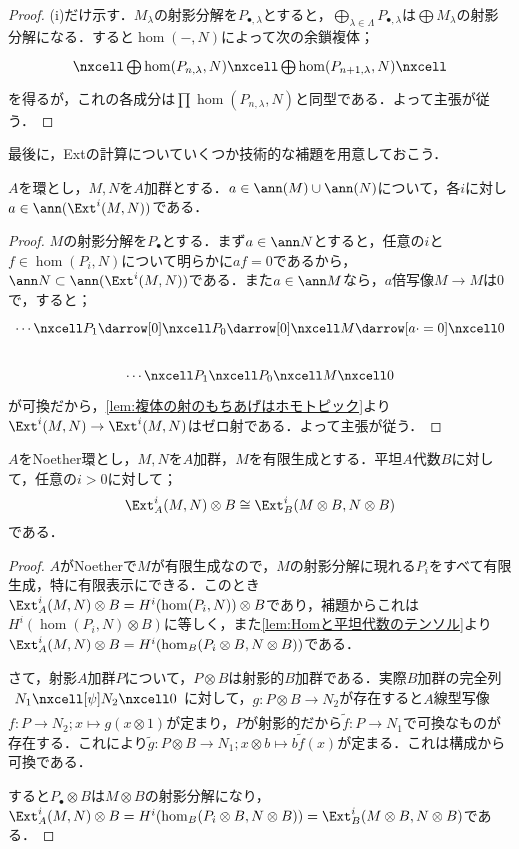 \begin{proof}
	(i)だけ示す．$M_\lambda$の射影分解を$P_{\bullet,\lambda}$とすると，$\bigoplus_{\lambda\in\Lambda} P_{\bullet,\lambda}$は$\bigoplus M_\lambda$の射影分解になる．すると$\hom(-,N)$によって次の余鎖複体；
	\[\begin{tikzcd}
		\nxcell\bigoplus \hom(P_{n,\lambda},N)\nxcell\bigoplus\hom(P_{n+1,\lambda},N)\nxcell
	\end{tikzcd}\]
	を得るが，これの各成分は$\prod\hom(P_{n,\lambda},N)$と同型である．よって主張が従う．
\end{proof}

最後に，Extの計算についていくつか技術的な補題を用意しておこう．

\begin{prop}\label{prop:ExtのAnn}
	$A$を環とし，$M,N$を$A$加群とする．$a\in\ann (M)\cup\ann (N)$について，各$i$に対し$a\in\ann(\Ext^i(M,N))$である．
\end{prop}

\begin{proof}
	$M$の射影分解を$P_\bullet$とする．まず$a\in\ann N$とすると，任意の$i$と$f\in\hom(P_i,N)$について明らかに$af=0$であるから，$\ann N\subset\ann(\Ext^i(M,N))$である．また$a\in\ann M$なら，$a$倍写像$M\to M$は$0$で，すると；
	\[\begin{tikzcd}
	\cdots\nxcell P_1\darrow[0]\nxcell P_0\darrow[0]\nxcell M\darrow[a\cdot=0]\nxcell0\\
	\cdots\nxcell P_1\nxcell P_0\nxcell M\nxcell 0
	\end{tikzcd}\]
	が可換だから，\ref{lem:複体の射のもちあげはホモトピック}より$\Ext^i(M,N)\to\Ext^i(M,N)$はゼロ射である．よって主張が従う．
\end{proof}

\begin{prop}\label{prop:平坦とExtの交換}
	$A$をNoether環とし，$M,N$を$A$加群，$M$を有限生成とする．平坦$A$代数$B$に対して，任意の$i>0$に対して；
	\[\Ext^i_A(M,N)\otimes B\cong\Ext^i_{B}(M\otimes B,N\otimes B)\]
	である．
\end{prop}

\begin{proof}
	$A$がNoetherで$M$が有限生成なので，$M$の射影分解に現れる$P_i$をすべて有限生成，特に有限表示にできる．このとき$\Ext^i_A(M,N)\otimes B=H^i(\hom(P_i,N))\otimes B$であり，補題からこれは$H^i(\hom(P_i,N)\otimes B)$に等しく，また\ref{lem:Homと平坦代数のテンソル}より$\Ext^i_A(M,N)\otimes B=H^i(\hom_B(P_i\otimes B,N\otimes B))$である．
	
	さて，射影$A$加群$P$について，$P\otimes B$は射影的$B$加群である．実際$B$加群の完全列$\begin{tikzcd}
	N_1\nxcell[\psi]N_2\nxcell0
	\end{tikzcd}$に対して，$g:P\otimes B\to N_2$が存在すると$A$線型写像$f:P\to N_2;x\mapsto g(x\otimes 1)$が定まり，$P$が射影的だから$\widetilde{f}:P\to N_1$で可換なものが存在する．これにより$\widetilde{g}:P\otimes B\to N_1;x\otimes b\mapsto b \widetilde{f}(x)$が定まる．これは構成から可換である．
	
	すると$P_\bullet\otimes B$は$M\otimes B$の射影分解になり，$\Ext^i_A(M,N)\otimes B=H^i(\hom_B(P_i\otimes B,N\otimes B))=\Ext^i_B(M\otimes B,N\otimes B)$である．
\end{proof}

